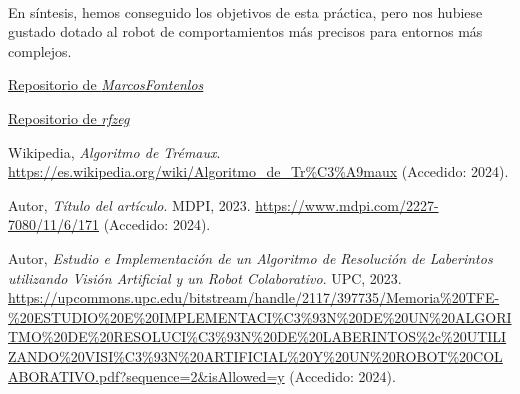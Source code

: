 \documentclass[a4paper,9pt]{article}
\begin{document}
\paragraph{}
En síntesis, hemos conseguido los objetivos de esta práctica, pero nos hubiese gustado dotado al robot de comportamientos 
más precisos para entornos más complejos.
\newpage
\begin{thebibliography}{8}

    \href{https://github.com/MarcosFontenlos/Axentes_intelixentes}{Repositorio de \textit{MarcosFontenlos}}
    
    \href{https://github.com/rfzeg/plywood_mazes}{Repositorio de \textit{rfzeg}}
    
     Wikipedia, \textit{Algoritmo de Trémaux}. \url{https://es.wikipedia.org/wiki/Algoritmo_de_Tr%C3%A9maux} (Accedido: 2024).
    
     Autor, \textit{Título del artículo}. MDPI, 2023. \url{https://www.mdpi.com/2227-7080/11/6/171} (Accedido: 2024).
    
     Autor, \textit{Estudio e Implementación de un Algoritmo de Resolución de Laberintos utilizando Visión Artificial y un Robot Colaborativo}. UPC, 2023. \url{https://upcommons.upc.edu/bitstream/handle/2117/397735/Memoria%20TFE-%20ESTUDIO%20E%20IMPLEMENTACI%C3%93N%20DE%20UN%20ALGORITMO%20DE%20RESOLUCI%C3%93N%20DE%20LABERINTOS%2c%20UTILIZANDO%20VISI%C3%93N%20ARTIFICIAL%20Y%20UN%20ROBOT%20COLABORATIVO.pdf?sequence=2&isAllowed=y} (Accedido: 2024).
\end{thebibliography}
\end{document}
